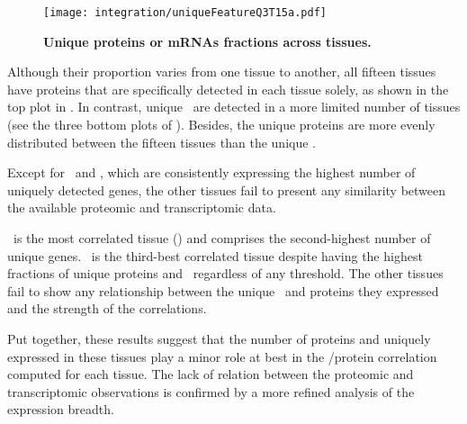 \begin{figure}[!htb]
    \texttt{[image: integration/uniqueFeatureQ3T15a.pdf]}\centering
    \vspace{-5mm}
    \caption[Unique proteins or mRNAs fractions across tissues]{\label{fig:UniqueFeatureQ3T15}
    \textbf{Unique proteins or mRNAs fractions across tissues.}
    }
\end{figure}

Although their proportion varies from one tissue to another,
all fifteen tissues have proteins
that are specifically detected in each tissue solely,
as shown in the top plot in .
In contrast, unique \mRNAs\ are detected in a more limited number of tissues
(see the three bottom plots of ).
Besides, the unique proteins are more evenly distributed
between the fifteen tissues than the unique \mRNAs.\mybr\

Except for \Testis\ and \Liver,
which are consistently expressing the highest number of uniquely detected genes,
the other tissues fail to present any similarity
between the available proteomic and transcriptomic data.\mybr\

\Liver\ is the most correlated tissue ()
and comprises the second-highest number of unique genes.
\Testis\ is the third-best correlated tissue
despite having the highest fractions of unique proteins and \mRNAs\
regardless of any threshold.
The other tissues fail to show any relationship
between the unique \mRNAs\ and proteins they expressed
and the strength of the correlations.\mybr\

Put together, these results suggest that
the number of proteins and \mRNAs{} uniquely expressed in these tissues
play a minor role at best in the \mRNA/protein correlation computed for each tissue.
The lack of relation between the proteomic and transcriptomic observations
is confirmed by a more refined analysis of the expression breadth.\mybr\

